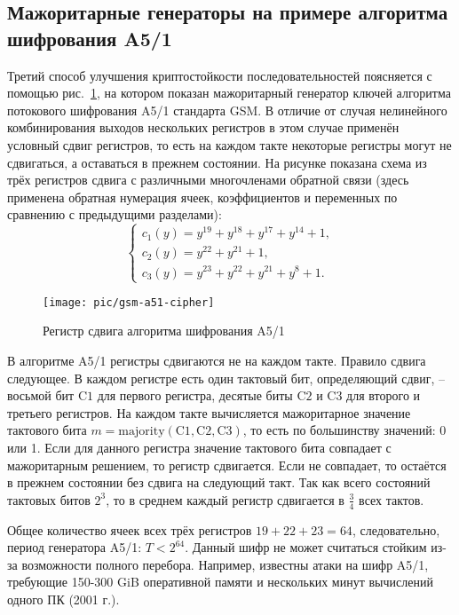 \subsection[Мажоритарные генераторы, шифр A5/1]{Мажоритарные генераторы на примере алгоритма шифрования A5/1}\label{section:majority_generators}

Третий способ улучшения криптостойкости последовательностей поясняется с помощью рис.~\ref{fig:gsm-a51-cipher}, на котором показан мажоритарный генератор ключей алгоритма потокового шифрования A5/1 стандарта GSM. В отличие от случая нелинейного комбинирования выходов нескольких регистров в этом случае применён условный сдвиг регистров, то есть на каждом такте некоторые регистры могут не сдвигаться, а оставаться в прежнем состоянии. На рисунке показана схема из трёх регистров сдвига с различными многочленами обратной связи (здесь применена обратная нумерация ячеек, коэффициентов и переменных по сравнению с предыдущими разделами):
\[ \left\{ \begin{array}{l}
    c_1(y) = y^{19} + y^{18} + y^{17} + y^{14} + 1, \\
    c_2(y) = y^{22} + y^{21} + 1, \\
    c_3(y) = y^{23} + y^{22} + y^{21} + y^8 + 1.
\end{array} \right. \]

\begin{figure}[!ht]
    \centering
	\texttt{[image: pic/gsm-a51-cipher]}
    \caption{Регистр сдвига алгоритма шифрования A5/1\label{fig:gsm-a51-cipher}}
\end{figure}

В алгоритме A5/1 регистры сдвигаются не на каждом такте. Правило сдвига следующее. В каждом регистре есть один тактовый бит, определяющий сдвиг, -- восьмой бит $\textrm{C1}$ для первого регистра, десятые биты $\textrm{C2}$ и $\textrm{C3}$ для второго и третьего регистров. На каждом такте вычисляется мажоритарное значение тактового бита $m = \textrm{majority}(\textrm{C1}, \textrm{C2}, \textrm{C3})$, то есть по большинству значений: 0 или 1. Если для данного регистра значение тактового бита совпадает с мажоритарным решением, то регистр сдвигается. Если не совпадает, то остаётся в прежнем состоянии без сдвига на следующий такт. Так как всего состояний тактовых битов $2^3$, то в среднем каждый регистр сдвигается в $\frac{3}{4}$ всех тактов.

Общее количество ячеек всех трёх регистров $19+22+23=64$, следовательно, период генератора A5/1: $T < 2^{64}$. Данный шифр не может считаться стойким из-за возможности полного перебора. Например, известны атаки на шифр A5/1, требующие 150-300 GiB оперативной памяти и нескольких минут вычислений одного ПК (2001 г.).
